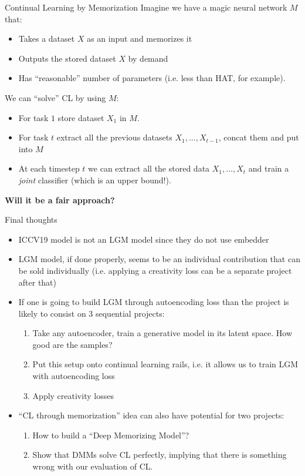 \documentclass[handout, 10pt]{beamer}
\begin{document}
\begin{frame}{Continual Learning by Memorization}
    Imagine we have a magic neural network $M$ that:
    \begin{itemize}
        \item\pause Takes a dataset $X$ as an input and memorizes it
        \item\pause Outputs the stored dataset $X$ by demand
        \item\pause Has ``reasonable'' number of parameters (i.e. less than HAT, for example).
    \end{itemize}
    
    We can ``solve'' CL by using $M$:
    \begin{itemize}
        \item\pause For task $1$ store dataset $X_1$ in $M$.
        \item\pause For task $t$ extract all the previous datasets $X_1, ..., X_{t-1}$, concat them and put into $M$
        \item\pause At each timestep $t$ we can extract all the stored data $X_1, ..., X_t$ and train a \textit{joint} classifier (which is an upper bound!).
    \end{itemize}
    
    \pause
    \textbf{Will it be a fair approach?}
\end{frame}

\begin{frame}{Final thoughts}
    \begin{itemize}
        \item\pause ICCV19 model is not an LGM model since they do not use embedder
        \item\pause LGM model, if done properly, seems to be an individual contribution that can be sold individually (i.e. applying a creativity loss can be a separate project after that)
        \item\pause If one is going to build LGM through autoencoding loss than the project is likely to consist on 3 sequential projects:
        \begin{enumerate}
            \item Take any autoencoder, train a generative model in its latent space. How good are the samples?
            \item Put this setup onto continual learning rails, i.e. it allows us to train LGM with autoencoding loss
            \item Apply creativity losses
        \end{enumerate}
        \item\pause ``CL through memorization'' idea can also have potential for two projects:
        \begin{enumerate}
            \item\pause How to build a ``Deep Memorizing Model''?
            \item\pause Show that DMMs solve CL perfectly, implying that there is something wrong with our evaluation of CL.
        \end{enumerate}
    \end{itemize}
\end{frame}
\end{document}
